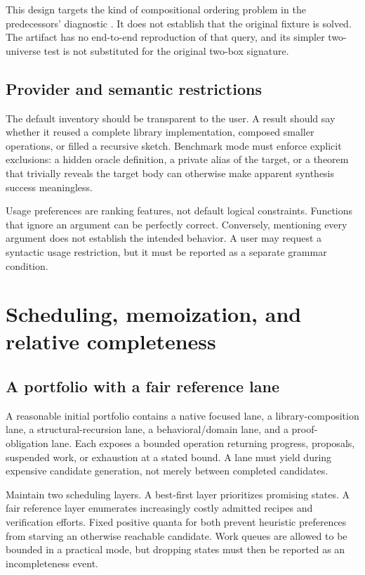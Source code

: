 This design targets the kind of compositional ordering problem in the predecessors' diagnostic \cite{indexing-report}. It does not establish that the original fixture is solved. The artifact has no end-to-end reproduction of that query, and its simpler two-universe test is not substituted for the original two-box signature.

\subsection{Provider and semantic restrictions}

The default inventory should be transparent to the user. A result should say whether it reused a complete library implementation, composed smaller operations, or filled a recursive sketch. Benchmark mode must enforce explicit exclusions: a hidden oracle definition, a private alias of the target, or a theorem that trivially reveals the target body can otherwise make apparent synthesis success meaningless.

Usage preferences are ranking features, not default logical constraints. Functions that ignore an argument can be perfectly correct. Conversely, mentioning every argument does not establish the intended behavior. A user may request a syntactic usage restriction, but it must be reported as a separate grammar condition.

\section{Scheduling, memoization, and relative completeness}
\label{sec:scheduler}

\subsection{A portfolio with a fair reference lane}

A reasonable initial portfolio contains a native focused lane, a library-composition lane, a structural-recursion lane, a behavioral/domain lane, and a proof-obligation lane. Each exposes a bounded  operation returning progress, proposals, suspended work, or exhaustion at a stated bound. A lane must yield during expensive candidate generation, not merely between completed candidates.

Maintain two scheduling layers. A best-first layer prioritizes promising states. A fair reference layer enumerates increasingly costly admitted recipes and verification efforts. Fixed positive quanta for both prevent heuristic preferences from starving an otherwise reachable candidate. Work queues are allowed to be bounded in a practical mode, but dropping states must then be reported as an incompleteness event.

